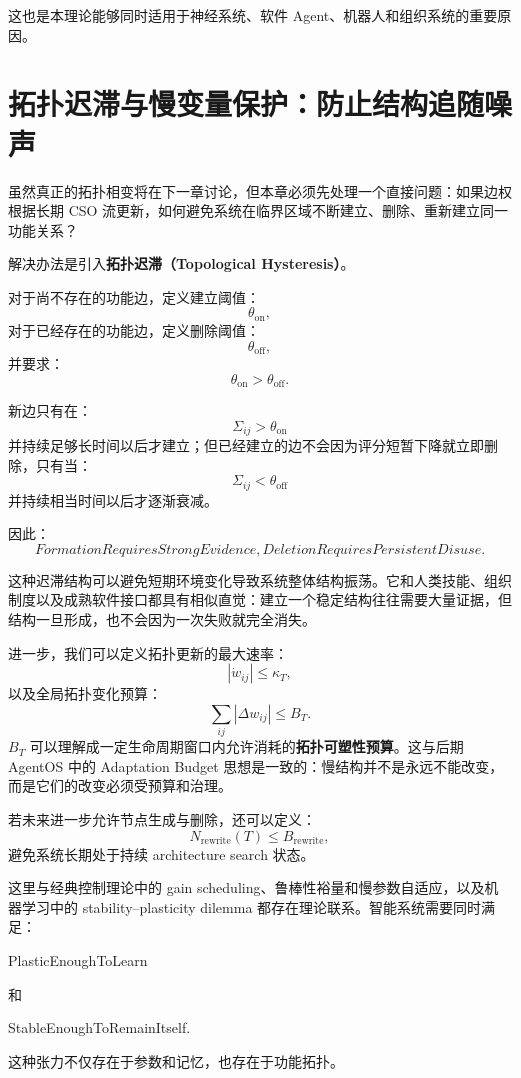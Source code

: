 这也是本理论能够同时适用于神经系统、软件 Agent、机器人和组织系统的重要原因。


\section{拓扑迟滞与慢变量保护：防止结构追随噪声}

虽然真正的拓扑相变将在下一章讨论，但本章必须先处理一个直接问题：如果边权根据长期 CSO 流更新，如何避免系统在临界区域不断建立、删除、重新建立同一功能关系？

解决办法是引入\textbf{拓扑迟滞（Topological Hysteresis）}。

对于尚不存在的功能边，定义建立阈值：
\[
\theta_{\mathrm{on}},
\]
对于已经存在的功能边，定义删除阈值：
\[
\theta_{\mathrm{off}},
\]
并要求：
\[
\boxed{
\theta_{\mathrm{on}}
>
\theta_{\mathrm{off}}.
}
\]

新边只有在：
\[
\Sigma_{ij}>\theta_{\mathrm{on}}
\]
并持续足够长时间以后才建立；但已经建立的边不会因为评分短暂下降就立即删除，只有当：
\[
\Sigma_{ij}<\theta_{\mathrm{off}}
\]
并持续相当时间以后才逐渐衰减。

因此：
\[
\boxed{
FormationRequiresStrongEvidence,
DeletionRequiresPersistentDisuse.
}
\]

这种迟滞结构可以避免短期环境变化导致系统整体结构振荡。它和人类技能、组织制度以及成熟软件接口都具有相似直觉：建立一个稳定结构往往需要大量证据，但结构一旦形成，也不会因为一次失败就完全消失。

进一步，我们可以定义拓扑更新的最大速率：
\[
\left|
\dot w_{ij}
\right|
\leq
\kappa_T,
\]
以及全局拓扑变化预算：
\[
\sum_{ij}
\left|
\Delta w_{ij}
\right|
\leq
B_T.
\]
$B_T$ 可以理解成一定生命周期窗口内允许消耗的\textbf{拓扑可塑性预算}。这与后期 AgentOS 中的 Adaptation Budget 思想是一致的：慢结构并不是永远不能改变，而是它们的改变必须受预算和治理。

若未来进一步允许节点生成与删除，还可以定义：
\[
N_{\mathrm{rewrite}}
(T)
\leq
B_{\mathrm{rewrite}},
\]
避免系统长期处于持续 architecture search 状态。

这里与经典控制理论中的 gain scheduling、鲁棒性裕量和慢参数自适应，以及机器学习中的 stability--plasticity dilemma 都存在理论联系。智能系统需要同时满足：
\begin{statementbox}
PlasticEnoughToLearn
\end{statementbox}
和
\begin{statementbox}
StableEnoughToRemainItself.
\end{statementbox}
这种张力不仅存在于参数和记忆，也存在于功能拓扑。

